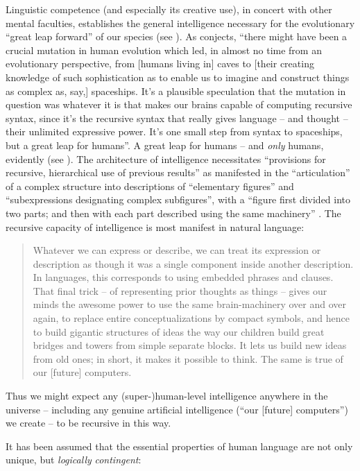 \documentclass[output=paper]{langsci/langscibook}
\begin{document}
Linguistic competence (and especially its creative use), in concert with other
mental faculties, establishes the general intelligence necessary for the
evolutionary “great leap forward” of our species (see \citealt{Chomsky2016book}).
As \citet[182]{Roberts2017} conjects, “there might have been a crucial mutation
in human evolution which led, in almost no time from an evolutionary
perspective, from [humans living in] caves to [their creating knowledge of such
sophistication as to enable us to imagine and construct things as complex as,
say,] spaceships. It’s a plausible speculation that the mutation in question
was whatever it is that makes our brains capable of computing recursive syntax,
since it’s the recursive syntax that really gives language – and thought –
their unlimited expressive power. It’s one small step from syntax to
spaceships, but a great leap for humans”. A great leap for humans – and
\emph{only} humans, evidently (see \citealt{BerwickChomsky2016}). The
architecture of intelligence necessitates “provisions for recursive,
hierarchical use of previous results” as manifested in the “articulation” of a
complex structure into descriptions of “elementary figures” and “subexpressions
designating complex subfigures”, with a “figure first divided into two parts;
and then with each part described using the same machinery”
\citep[16]{Minsky1963}. The recursive capacity of intelligence is most manifest
in natural language: 

\begin{quote}Whatever we can express or describe, we can treat its
expression or description as though it was a single component inside another
description. In languages, this corresponds to using embedded phrases and
clauses. That final trick – of representing prior thoughts as things – gives
our minds the awesome power to use the same brain-machinery over and over
again, to replace entire conceptualizations by compact symbols, and hence to
build gigantic structures of ideas the way our children build great bridges and
towers from simple separate blocks. It lets us build new ideas from old ones;
in short, it makes it possible to think. The same is true of our [future]
computers. \hfill\hbox{\citep[124]{Minsky1985}}\end{quote}
Thus we might expect any \mbox{(super-)}human-level intelligence anywhere in the universe – 
including any genuine artificial intelligence (“our [future] computers”) we create – 
to be recursive in this way.

It has been assumed that the essential properties of human language are not
only unique, but \emph{logically} \emph{contingent}:
\end{document}
